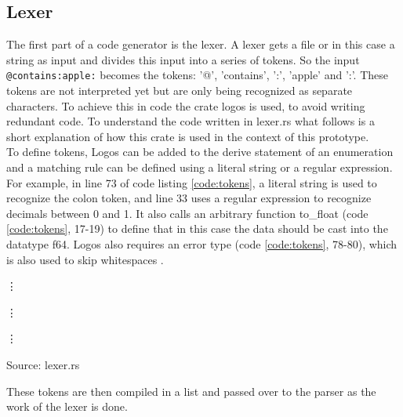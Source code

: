 \subsection{Lexer}
The first part of a code generator is the lexer. A lexer gets a file or in this case a string as input and divides this input into a series of tokens. So the input \lstinline[language=Fulltext-Search]$@contains:apple:$ becomes the tokens: '@', 'contains', ':', 'apple' and ':'. These tokens are not interpreted yet but are only being recognized as separate characters. To achieve this in code the crate logos is used, to avoid writing redundant code. To understand the code written in lexer.rs what follows is a short explanation of how this crate is used in the context of this prototype.\\
To define tokens, Logos can be added to the derive statement of an enumeration and a matching rule can be defined using a literal string or a regular expression. For example, in line 73 of code listing \ref{code:tokens}, a literal string is used to recognize the colon token, and line 33 uses a regular expression to recognize decimals between 0 and 1. It also calls an arbitrary function to\_float (code \ref{code:tokens}, 17-19) to define that in this case the data should be cast into the datatype f64. Logos also requires an error type (code \ref{code:tokens}, 78-80), which is also used to skip whitespaces \parencite[cf.][n.p.]{hirsz_logos_2022}.
\begin{codeenv}
    \label{code:tokens}
    
    \vdots
    
    \vdots
    
    \vdots
    
    \centerline{Source: lexer.rs}
\end{codeenv}
These tokens are then compiled in a list and passed over to the parser as the work of the lexer is done.
